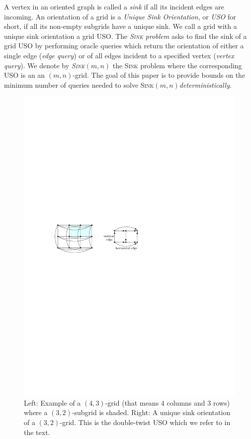\documentclass[runningheads,a4paper]{llncs}
\newcommand{\AT}[1]{\marginpar{\parbox{3.6cm}{{\small {\bf AT:} #1}}}} %
\newcommand{\sink}{\textsc{Sink}\xspace}
\newcommand{\sinkmn}{\textsc{Sink}$(m,n)$\xspace}
\begin{document}
A vertex in an oriented graph is called a \emph{sink} if all its incident edges are incoming.
An orientation of a grid is a \emph{Unique Sink Orientation}, or \emph{USO}
for short, if all its non-empty subgrids have a unique sink. 
We call a grid with a unique sink orientation a grid USO.
The \emph{\sink problem} asks to find the sink of a grid USO by performing oracle queries which return the orientation of either a single edge (\emph{edge query}) or of all edges incident to a specified vertex (\emph{vertex query}). 
We denote by \emph{\sinkmn} the \sink problem 
where the corresponding USO is an an $(m,n)$-grid.
The goal of this paper is to provide bounds on the minimum number of queries needed to solve
\sinkmn \emph{deterministically}.


  \begin{figure}[h] 
  	\centering
  	\includegraphics{uso_example.pdf}
  	\caption{\small Left: Example of a $(4,3)$-grid (that means $4$ columns and $3$ rows) where a $(3,2)$-subgrid is shaded. Right: A unique sink orientation of a $(3,2)$-grid. %
  	This is the double-twist USO which we refer to in the text.}
  	\label{fig:examplegrid}
	\vspace{-.2in}
  \end{figure}
\end{document}
